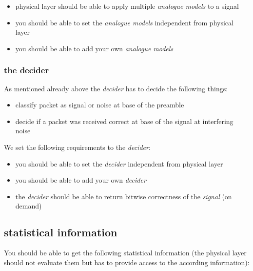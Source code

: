 \begin{itemize}
 \item physical layer should be able to apply multiple \textit{analogue models} to a signal
 \item you should be able to set the \textit{analogue models} independent from physical layer
 \item you should be able to add your own \textit{analogue models}
\end{itemize}

\subsubsection{the decider}
\label{decider}

As mentioned already above the \textit{decider} has to decide the following things:

\begin{itemize}
\item classify packet as signal or noise at base of the preamble
\item decide if a packet was received correct at base of the signal at interfering noise
\end{itemize}

We set the following requirements to the \textit{decider}:

\begin{itemize}
 \item you should be able to set the \textit{decider} independent from physical layer
 \item you should be able to add your own \textit{decider}
 \item the \textit{decider} should be able to return bitwise correctness of the \textit{signal} (on demand)
\end{itemize}


\subsection{statistical information}
\label{statistic}

You should be able to get the following statistical information (the physical layer should not evaluate them but has to provide access to the according information):

